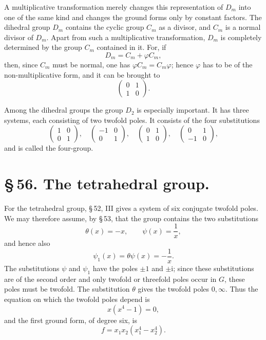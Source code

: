 \documentclass[11pt]{article}
\providecommand{\ii}{\mathrm{i}}
\providecommand{\mat}[4]{\begin{pmatrix}#1&#2\\#3&#4\end{pmatrix}}
\providecommand{\mat}[4]{\begin{pmatrix}#1&#2\\#3&#4\end{pmatrix}}
\providecommand{\mat}[1]{\begin{pmatrix}#1\end{pmatrix}}
\begin{document}
A multiplicative transformation merely changes this representation of $D_m$ into one of the same kind and changes the ground forms only by constant factors. The dihedral group $D_m$ contains the cyclic group $C_m$ as a divisor, and $C_m$ is a normal divisor of $D_m$. Apart from such a multiplicative transformation, $D_m$ is completely determined by the group $C_m$ contained in it. For, if
\[
D_m=C_m+\varphi C_m,
\]
then, since $C_m$ must be normal, one has $\varphi C_m=C_m\varphi$; hence $\varphi$ has to be of the non-multiplicative form, and it can be brought to
\[
 \mat{0}{1}{1}{0}.
\]

Among the dihedral groups the group $D_2$ is especially important. It has three systems, each consisting of two twofold poles. It consists of the four substitutions
\begin{equation}
 \mat{1}{0}{0}{1},\quad
 \mat{-1}{0}{0}{1},\quad
 \mat{0}{1}{1}{0},\quad
 \mat{0}{1}{-1}{0},
\tag{7}
\end{equation}
and is called the four-group.

\section*{\S\,56. The tetrahedral group.}

For the tetrahedral group, \S\,52, III gives a system of six conjugate twofold poles. We may therefore assume, by \S\,53, that the group contains the two substitutions
\begin{equation}
 \theta(x)=-x,\qquad \psi(x)=\frac1x,
\tag{1}
\end{equation}
and hence also
\[
 \psi_1(x)=\theta\psi(x)=-\frac1x .
\]
The substitutions $\psi$ and $\psi_1$ have the poles $\pm1$ and $\pm\ii$; since these substitutions are of the second order and only twofold or threefold poles occur in $G$, these poles must be twofold. The substitution $\theta$ gives the twofold poles $0,\infty$. Thus the equation on which the twofold poles depend is
\[
 x(x^4-1)=0,
\]
and the first ground form, of degree six, is
\begin{equation}
 f=x_1x_2(x_1^4-x_2^4).
\tag{2}
\end{equation}
\end{document}

